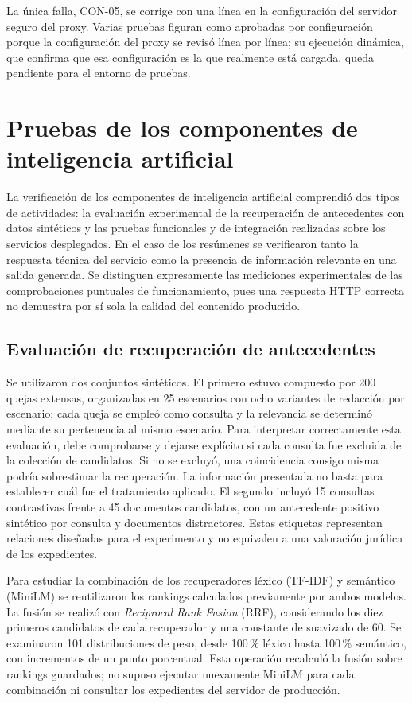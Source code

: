 	La única falla, CON-05, se corrige con una línea en la configuración del servidor seguro del proxy.
	Varias pruebas figuran como aprobadas por configuración porque la configuración del proxy se revisó
	línea por línea; su ejecución dinámica, que confirma que esa configuración es la que realmente está
	cargada, queda pendiente para el entorno de pruebas.
	
	\section{Pruebas de los componentes de inteligencia artificial}
\label{sec:pruebas_ia}

La verificación de los componentes de inteligencia artificial comprendió dos tipos de actividades:
la evaluación experimental de la recuperación de antecedentes con datos sintéticos y las
pruebas funcionales y de integración realizadas sobre los servicios desplegados. En el caso de
los resúmenes se verificaron tanto la respuesta técnica del servicio como la presencia de
información relevante en una salida generada. Se distinguen expresamente las mediciones
experimentales de las comprobaciones puntuales de funcionamiento, pues una respuesta HTTP
correcta no demuestra por sí sola la calidad del contenido producido.

\subsection{Evaluación de recuperación de antecedentes}
\label{sec:pruebas_ia_antecedentes}

Se utilizaron dos conjuntos sintéticos. El primero estuvo compuesto por 200 quejas extensas,
organizadas en 25 escenarios con ocho variantes de redacción por escenario; cada queja se
empleó como consulta y la relevancia se determinó mediante su pertenencia al mismo escenario.
Para interpretar correctamente esta evaluación, debe comprobarse y dejarse explícito
si cada consulta fue excluida de la colección de candidatos. Si no se excluyó,
una coincidencia consigo misma podría sobrestimar la recuperación. La información
presentada no basta para establecer cuál fue el tratamiento aplicado.
El segundo incluyó 15 consultas contrastivas frente a 45 documentos candidatos, con un
antecedente positivo sintético por consulta y documentos distractores. Estas etiquetas
representan relaciones diseñadas para el experimento y no equivalen a una valoración jurídica
de los expedientes.

Para estudiar la combinación de los recuperadores léxico (TF-IDF) y semántico (MiniLM) se
reutilizaron los rankings calculados previamente por ambos modelos. La fusión se realizó con
\textit{Reciprocal Rank Fusion} (RRF), considerando los diez primeros candidatos de cada
recuperador y una constante de suavizado de 60. Se examinaron 101 distribuciones de peso,
desde 100\,\% léxico hasta 100\,\% semántico, con incrementos de un punto porcentual. Esta
operación recalculó la fusión sobre rankings guardados; no supuso ejecutar nuevamente MiniLM
para cada combinación ni consultar los expedientes del servidor de producción.

